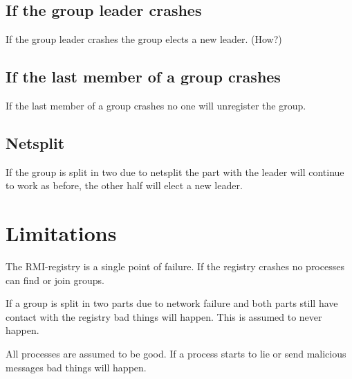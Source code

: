 \documentclass[11pt,swedish]{article}
\begin{document}
\subsection{If the group leader crashes}
If the group leader crashes the group elects a new leader. (How?)

\subsection{If the last member of a group crashes}
If the last member of a group crashes no one will unregister the group.

\subsection{Netsplit}
If the group is split in two due to netsplit the part with the leader will continue to work as before, the other half will elect a new leader.

\section{Limitations}
The RMI-registry is a single point of failure. If the registry crashes no processes can find or join groups. 

If a group is split in two parts due to network failure and both parts still have contact  with the registry bad things will happen. This is assumed to never happen.

All processes are assumed to be good. If a process starts to lie or send malicious messages bad things will happen.
\end{document}
